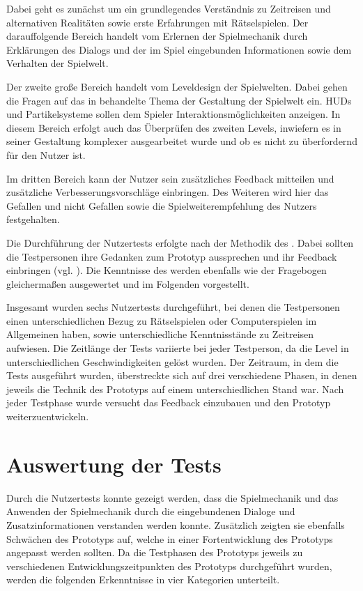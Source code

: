 Dabei geht es zunächst um ein grundlegendes Verständnis zu Zeitreisen und alternativen Realitäten sowie erste Erfahrungen mit Rätselspielen. 
Der darauffolgende Bereich handelt vom Erlernen der Spielmechanik durch Erklärungen des Dialogs und der im Spiel eingebunden Informationen sowie dem Verhalten der Spielwelt.

Der zweite große Bereich handelt vom Leveldesign der Spielwelten. Dabei gehen die Fragen auf das in  behandelte Thema der Gestaltung der Spielwelt ein. \ac{HUD}s und Partikelsysteme sollen dem Spieler Interaktionsmöglichkeiten anzeigen. In diesem Bereich erfolgt auch das Überprüfen des zweiten Levels, inwiefern es in seiner Gestaltung komplexer ausgearbeitet wurde und ob es nicht zu überfordernd für den Nutzer ist.

Im dritten Bereich kann der Nutzer sein zusätzliches Feedback mitteilen und zusätzliche Verbesserungsvorschläge einbringen. Des Weiteren wird hier das Gefallen und nicht Gefallen sowie die Spielweiterempfehlung des Nutzers festgehalten.

Die Durchführung der Nutzertests erfolgte nach der Methodik des . Dabei sollten die Testpersonen ihre Gedanken zum Prototyp aussprechen und ihr Feedback einbringen (vgl. \cite{usabilityde_gmbh__co_kg_concurrent_2023}). Die Kenntnisse des  werden ebenfalls wie der Fragebogen gleichermaßen ausgewertet und im Folgenden  vorgestellt.

Insgesamt wurden sechs Nutzertests durchgeführt, bei denen die Testpersonen einen unterschiedlichen Bezug zu Rätselspielen oder Computerspielen im Allgemeinen haben, sowie unterschiedliche Kenntnisstände zu Zeitreisen aufwiesen. Die Zeitlänge der Tests variierte bei jeder Testperson, da die Level in unterschiedlichen Geschwindigkeiten gelöst wurden.
Der Zeitraum, in dem die Tests ausgeführt wurden, überstreckte sich auf drei verschiedene Phasen, in denen jeweils die Technik des Prototyps auf einem unterschiedlichen Stand war. Nach jeder Testphase wurde versucht das Feedback einzubauen und den Prototyp weiterzuentwickeln.

\section{Auswertung der Tests}\label{sec:test-result}
Durch die Nutzertests konnte gezeigt werden, dass die Spielmechanik und das Anwenden der Spielmechanik durch die eingebundenen Dialoge und Zusatzinformationen verstanden werden konnte. Zusätzlich zeigten sie ebenfalls Schwächen des Prototyps auf, welche in einer Fortentwicklung des Prototyps angepasst werden sollten. 
Da die Testphasen des Prototyps jeweils zu verschiedenen Entwicklungszeitpunkten des Prototyps durchgeführt wurden, werden die folgenden Erkenntnisse in vier Kategorien unterteilt.

